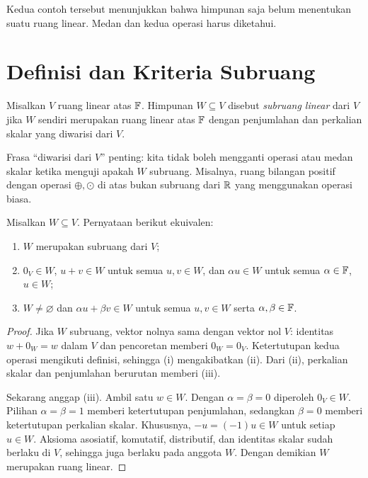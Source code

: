 Kedua contoh tersebut menunjukkan bahwa himpunan saja belum
menentukan suatu ruang linear. Medan dan kedua operasi harus diketahui.

\section{Definisi dan Kriteria Subruang}
\label{linear:subruang}

\begin{definisi}
    Misalkan $V$ ruang linear atas $\mathbb{F}$. Himpunan $W\subseteq V$
    disebut \emph{subruang linear} dari $V$ jika $W$ sendiri
    merupakan ruang linear atas $\mathbb{F}$ dengan penjumlahan dan
    perkalian skalar yang diwarisi dari $V$.
\end{definisi}

Frasa ``diwarisi dari $V$'' penting: kita tidak boleh mengganti
operasi atau medan skalar ketika menguji apakah $W$ subruang.
Misalnya, ruang bilangan positif dengan operasi $\oplus,\odot$
di atas bukan subruang dari $\mathbb{R}$ yang menggunakan operasi biasa.

\begin{teorema}
    Misalkan $W\subseteq V$. Pernyataan berikut ekuivalen:
    \begin{enumerate}[label=(\roman*),nosep]
        \item $W$ merupakan subruang dari $V$;
        \item $0_V\in W$, $u+v\in W$ untuk semua $u,v\in W$,
              dan $\alpha u\in W$ untuk semua $\alpha\in\mathbb{F}$, $u\in W$;
        \item $W\ne\varnothing$ dan
              $\alpha u+\beta v\in W$ untuk semua $u,v\in W$
              serta $\alpha,\beta\in\mathbb{F}$.
    \end{enumerate}
\end{teorema}
\begin{proof}
    Jika $W$ subruang, vektor nolnya sama dengan vektor nol $V$:
    identitas $w+0_W=w$ dalam $V$ dan pencoretan memberi $0_W=0_V$.
    Ketertutupan kedua operasi mengikuti definisi, sehingga (i)
    mengakibatkan (ii). Dari (ii), perkalian skalar dan penjumlahan
    berurutan memberi (iii).

    Sekarang anggap (iii). Ambil satu $w\in W$.
    Dengan $\alpha=\beta=0$ diperoleh $0_V\in W$.
    Pilihan $\alpha=\beta=1$ memberi ketertutupan penjumlahan,
    sedangkan $\beta=0$ memberi ketertutupan perkalian skalar.
    Khususnya, $-u=(-1)u\in W$ untuk setiap $u\in W$.
    Aksioma asosiatif, komutatif, distributif, dan identitas skalar
    sudah berlaku di $V$, sehingga juga berlaku pada anggota $W$.
    Dengan demikian $W$ merupakan ruang linear.
\end{proof}

